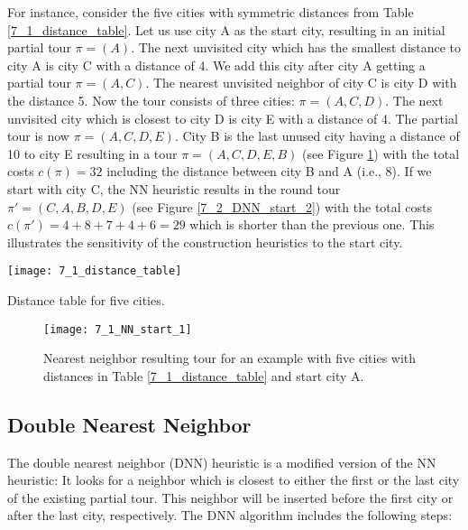 For instance, consider the five cities with symmetric distances from Table \ref{7_1_distance_table}. Let us use city A as the start city, resulting in an initial partial tour $\pi = (A)$. The next unvisited city which has the smallest distance to city A is city C with a distance of 4. We add this city after city A getting a partial tour $\pi = (A, C)$. The nearest unvisited neighbor of city C is city D  with the distance 5. Now the tour consists of three cities: $\pi = (A, C, D)$. The next unvisited city which is closest to city D is city E with a distance of 4. The partial tour is now $\pi = (A, C, D, E)$. City B is the last unused city having a distance of 10 to city E resulting in a tour $\pi = (A, C, D, E, B)$ (see Figure \ref{7_1_NN_start_1}) with the total costs $c(\pi) = 32$ including the distance between city B and A (i.e., 8). If we start with city C,  the NN heuristic results in the round tour $\pi' = (C, A, B, D, E)$ (see Figure \ref{7_2_DNN_start_2}) with the total costs $c(\pi') = 4 + 8 + 7 + 4 + 6 = 29$ which is shorter than the previous one. This illustrates the sensitivity of the construction heuristics to the start city.

\begin{table}[htp] \centering
	\centering
	\texttt{[image: 7\_1\_distance\_table]}
	\caption{Distance table for five cities.}
	\label{7_1_distance_table}
\end{table}


\begin{figure}[htp] \centering
	\centering
	\texttt{[image: 7\_1\_NN\_start\_1]}
	\caption{Nearest neighbor resulting tour for an example with five cities with distances in Table \ref{7_1_distance_table} and start city A.}
	\label{7_1_NN_start_1}
\end{figure}


\subsection{Double Nearest Neighbor}
\label{subsec:dnn}
The double nearest neighbor (DNN) heuristic is a modified version of the NN heuristic: It looks for a neighbor which is closest to either the first or the last city of the existing partial tour. This neighbor will be inserted before the first city or after the last city, respectively. The DNN algorithm includes the following steps:

